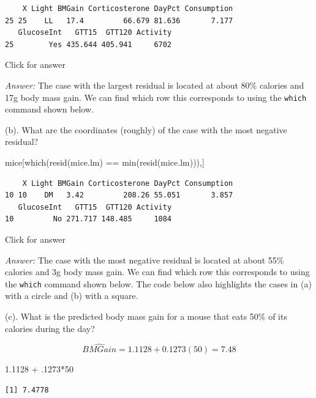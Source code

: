 \documentclass[
]{book}
\newenvironment{Shaded}{\begin{snugshade}}{\end{snugshade}}
\newcommand{\DecValTok}[1]{\textcolor[rgb]{0.00,0.00,0.81}{#1}}
\newcommand{\FloatTok}[1]{\textcolor[rgb]{0.00,0.00,0.81}{#1}}
\newcommand{\FunctionTok}[1]{\textcolor[rgb]{0.00,0.00,0.00}{#1}}
\newcommand{\NormalTok}[1]{#1}
\newcommand{\SpecialCharTok}[1]{\textcolor[rgb]{0.00,0.00,0.00}{#1}}
\begin{document}
\begin{verbatim}
    X Light BMGain Corticosterone DayPct Consumption
25 25    LL   17.4         66.679 81.636       7.177
   GlucoseInt   GTT15  GTT120 Activity
25        Yes 435.644 405.941     6702
\end{verbatim}

Click for answer

\emph{Answer:} The case with the largest residual is located at about 80\% calories and 17g body mass gain. We can find which row this corresponds to using the \texttt{which} command shown below.

(b). What are the coordinates (roughly) of the case with the most negative residual?

\begin{Shaded}
\begin{Highlighting}[]
\NormalTok{mice[}\FunctionTok{which}\NormalTok{(}\FunctionTok{resid}\NormalTok{(mice.lm) }\SpecialCharTok{==} \FunctionTok{min}\NormalTok{(}\FunctionTok{resid}\NormalTok{(mice.lm))),]}
\end{Highlighting}
\end{Shaded}

\begin{verbatim}
    X Light BMGain Corticosterone DayPct Consumption
10 10    DM   3.42         208.26 55.051       3.857
   GlucoseInt   GTT15  GTT120 Activity
10         No 271.717 148.485     1084
\end{verbatim}

Click for answer

\emph{Answer:} The case with the most negative residual is located at about 55\% calories and 3g body mass gain. We can find which row this corresponds to using the \texttt{which} command shown below. The code below also highlights the cases in (a) with a circle and (b) with a square.

(c). What is the predicted body mass gain for a mouse that eats 50\% of its calories during the day?

\[
\widehat{BMGain} =1.1128+0.1273(50)=7.48
\]

\begin{Shaded}
\begin{Highlighting}[]
\FloatTok{1.1128} \SpecialCharTok{+}\NormalTok{ .}\DecValTok{1273}\SpecialCharTok{*}\DecValTok{50}
\end{Highlighting}
\end{Shaded}

\begin{verbatim}
[1] 7.4778
\end{verbatim}
\end{document}

